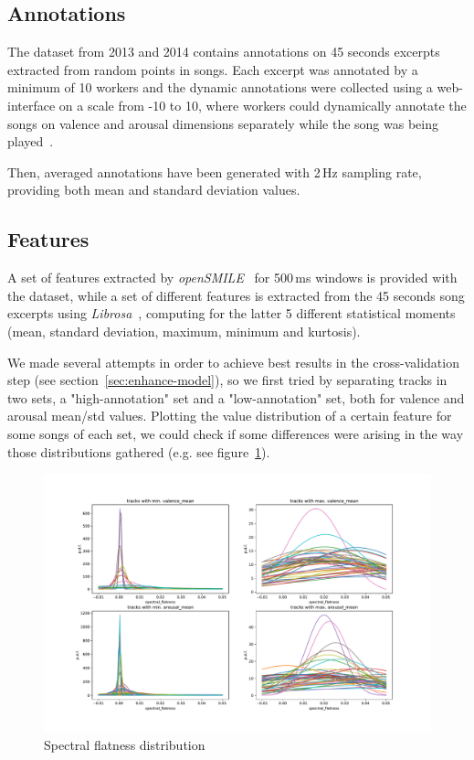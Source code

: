 \subsection{Annotations}\label{sec:annotations}

The dataset from 2013 and 2014 contains annotations on 45 seconds excerpts extracted from random points in songs. Each excerpt was annotated by a minimum of 10 workers and the dynamic annotations were collected using a web-interface on a scale from -10 to 10, where workers could dynamically annotate the songs on valence and arousal dimensions separately while the song was being played~\cite{aljanaki2017developing}.

Then, averaged annotations have been generated with 2\,Hz sampling rate, providing both mean and standard deviation values.~\cite{soleymani2016deam}


\subsection{Features}\label{sec:features}

A set of features extracted by \emph{openSMILE}~\cite{opensmile} for 500\,ms windows is provided with the dataset, while a set of different features is extracted from the 45 seconds song excerpts using \emph{Librosa}~\cite{librosa}, computing for the latter 5 different statistical moments (mean, standard deviation, maximum, minimum and kurtosis).

We made several attempts in order to achieve best results in the cross-validation step (see section~\ref{sec:enhance-model}), so we first tried by separating tracks in two sets, a "high-annotation" set and a "low-annotation" set, both for valence and arousal mean/std values. Plotting the value distribution of a certain feature for some songs of each set, we could check if some differences were arising in the way those distributions gathered (e.g. see figure~\ref{fig:va_mean-spectral_flatness-dists}).

\begin{figure}
	\centering
	\includegraphics[width=1\linewidth]{assets/va_mean-spectral_flatness-dists.pdf}
	\caption{Spectral flatness distribution}
	\label{fig:va_mean-spectral_flatness-dists}
\end{figure}

